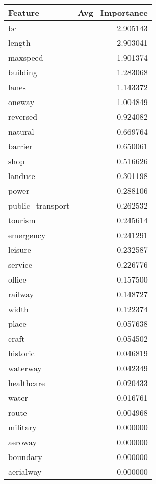 \begin{tabular}{lr}
\toprule
Feature & Avg_Importance \\
\midrule
bc & 2.905143 \\
length & 2.903041 \\
maxspeed & 1.901374 \\
building & 1.283068 \\
lanes & 1.143372 \\
oneway & 1.004849 \\
reversed & 0.924082 \\
natural & 0.669764 \\
barrier & 0.650061 \\
shop & 0.516626 \\
landuse & 0.301198 \\
power & 0.288106 \\
public_transport & 0.262532 \\
tourism & 0.245614 \\
emergency & 0.241291 \\
leisure & 0.232587 \\
service & 0.226776 \\
office & 0.157500 \\
railway & 0.148727 \\
width & 0.122374 \\
place & 0.057638 \\
craft & 0.054502 \\
historic & 0.046819 \\
waterway & 0.042349 \\
healthcare & 0.020433 \\
water & 0.016761 \\
route & 0.004968 \\
military & 0.000000 \\
aeroway & 0.000000 \\
boundary & 0.000000 \\
aerialway & 0.000000 \\
\bottomrule
\end{tabular}
